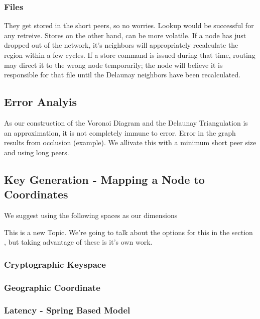 \documentclass{IEEEtran}
\begin{document}
\subsubsection{Files}
They get stored in the short peers, so no worries.  Lookup would be successful for any retreive.  Stores on the other hand, can be more volatile.  If a node has just dropped out of the network, it's neighbors will appropriately recalculate the region within a few cycles.  If a store command is issued during that time, routing may direct it to the wrong node temporarily;  the node will believe it is responsible for that file until the Delaunay neighbors have been recalculated. 




\subsection{Error Analyis}
As our construction of the Voronoi Diagram and the Delaunay Triangulation is an approximation, it is not completely immune to error. Error in the graph results from occlusion (example).  We allivate this with a minimum short peer size and using long peers.



\subsection{Key Generation - Mapping a Node to Coordinates}

We suggest using the following spaces as our dimensions

This is a new Topic.  We're going to talk about the options for this in the section , but taking advantage of these is it's own work.

\subsubsection{Cryptographic Keyspace}


\subsubsection{Geographic Coordinate}

\subsubsection{Latency - Spring Based Model}
\end{document}

